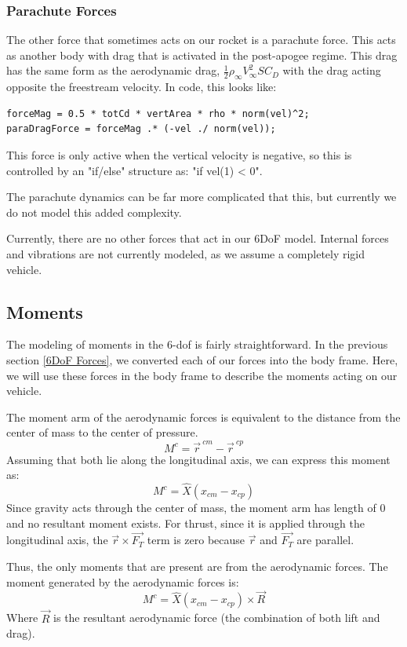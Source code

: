 \documentclass[12pt]{report}
\begin{document}
\subsubsection{Parachute Forces}
The other force that sometimes acts on our rocket is a parachute force. This acts as another body with drag that is activated in the post-apogee regime. This drag has the same form as the aerodynamic drag, $\frac{1}{2}\rho_{\infty} V_{\infty}^2SC_D$ with the drag acting opposite the freestream velocity. In code, this looks like:
\begin{lstlisting}[style=Matlab-editor]
forceMag = 0.5 * totCd * vertArea * rho * norm(vel)^2;
paraDragForce = forceMag .* (-vel ./ norm(vel)); 
\end{lstlisting}
This force is only active when the vertical velocity is negative, so this is controlled by an "if/else" structure as: "if vel(1) < 0". 

The parachute dynamics can be far more complicated that this, but currently we do not model this added complexity. 

Currently, there are no other forces that act in our 6DoF model. Internal forces and vibrations are not currently modeled, as we assume a completely rigid vehicle.
\subsection{Moments}
The modeling of moments in the 6-\gls{dof} is fairly straightforward. In the previous section \ref{6DoF Forces}, we converted each of our forces into the body frame. Here, we will use these forces in the body frame to describe the moments acting on our vehicle. 

The moment arm of the aerodynamic forces is equivalent to the distance from the center of mass to the center of pressure. 
\begin{equation}
    M^c=\vec{r}^{\ cm}-\vec{r}^{\ cp}
\end{equation}
Assuming that both lie along the longitudinal axis, we can express this moment as:
\begin{equation}
    M^c=\hat{X}(x_{cm}-x_{cp})
\end{equation}
Since gravity acts through the center of mass, the moment arm has length of 0 and no resultant moment exists. For thrust, since it is applied through the longitudinal axis, the $\vec{r}\times \vec{F_T}$ term is zero because $\vec{r}$ and $\vec{F_T}$ are parallel.

Thus, the only moments that are present are from the aerodynamic forces. The moment generated by the aerodynamic forces is:
\begin{equation}
    M^c=\hat{X}(x_{cm}-x_{cp})\times \vec{R}
\end{equation}
Where $\vec{R}$ is the resultant aerodynamic force (the combination of both lift and drag).
\end{document}
